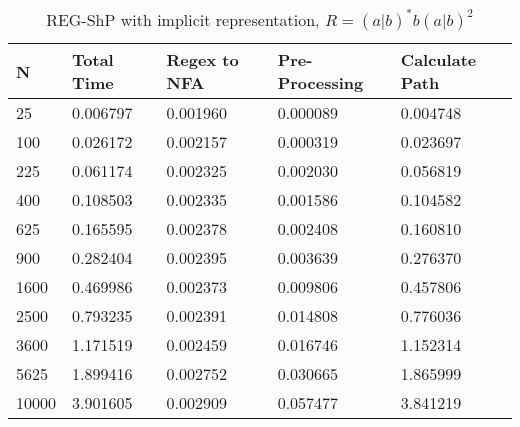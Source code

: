 \documentclass[]{article}
\numberwithin{equation}{section}
\begin{document}
\begin{appendices}
\begin{table}[H]
	\centering
	\small
	\setlength\tabcolsep{2pt}
	\begin{tabular}{|l|l|l|l|l|}
		\hline
		N     & Total Time & Regex to NFA & Pre-Processing & Calculate Path  \\ \hline
		25    & 0.006797   & 0.001960     & 0.000089       & 0.004748        \\ \hline
		100   & 0.026172   & 0.002157     & 0.000319       & 0.023697        \\ \hline
		225   & 0.061174   & 0.002325     & 0.002030       & 0.056819        \\ \hline
		400   & 0.108503   & 0.002335     & 0.001586       & 0.104582        \\ \hline
		625   & 0.165595   & 0.002378     & 0.002408       & 0.160810        \\ \hline
		900   & 0.282404   & 0.002395     & 0.003639       & 0.276370        \\ \hline
		1600  & 0.469986   & 0.002373     & 0.009806       & 0.457806        \\ \hline
		2500  & 0.793235   & 0.002391     & 0.014808       & 0.776036        \\ \hline
		3600  & 1.171519   & 0.002459     & 0.016746       & 1.152314        \\ \hline
		5625  & 1.899416   & 0.002752     & 0.030665       & 1.865999        \\ \hline
		10000 & 3.901605   & 0.002909     & 0.057477       & 3.841219        \\ \hline
	\end{tabular}
	\caption{REG-ShP with implicit representation, $R = (a|b)^*b(a|b)^2$}
\end{table}


\end{appendices}
\end{document}
